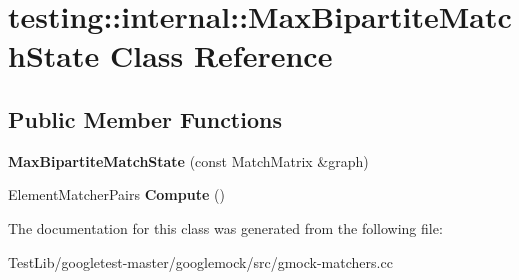 \hypertarget{classtesting_1_1internal_1_1MaxBipartiteMatchState}{}\section{testing\+:\+:internal\+:\+:Max\+Bipartite\+Match\+State Class Reference}
\label{classtesting_1_1internal_1_1MaxBipartiteMatchState}
\subsection*{Public Member Functions}
\begin{DoxyCompactItemize}
\item 
\mbox{\label{classtesting_1_1internal_1_1MaxBipartiteMatchState_a9d0166d5cc7afd1b741f6c312df72b54}} 
{\bfseries Max\+Bipartite\+Match\+State} (const Match\+Matrix \&graph)
\item 
\mbox{\label{classtesting_1_1internal_1_1MaxBipartiteMatchState_af6efab664ee390925b24d023f1368192}} 
Element\+Matcher\+Pairs {\bfseries Compute} ()
\end{DoxyCompactItemize}


The documentation for this class was generated from the following file\+:\begin{DoxyCompactItemize}
\item 
Test\+Lib/googletest-\/master/googlemock/src/gmock-\/matchers.\+cc\end{DoxyCompactItemize}
